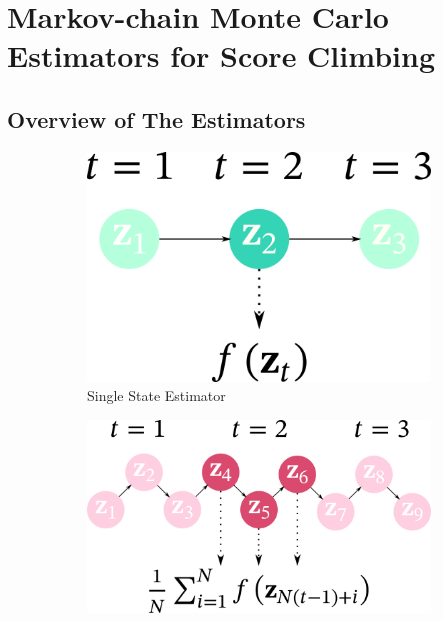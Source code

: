 
\section{Markov-chain Monte Carlo Estimators for Score Climbing}
\vspace{-0.05in}
\subsection{Overview of The Estimators}\label{section:overview}
%


\begin{figure}
  \vspace{-0.5in}
    \centering
    \begin{subfigure}[b]{0.25\textwidth}
        \centering
        \includegraphics[scale=0.25]{figures/diagram_1.png}
        \caption{Single State Estimator}\label{fig:single}
    \end{subfigure}
    \begin{subfigure}[b]{0.35\textwidth}
        \centering
        \includegraphics[scale=0.25]{figures/diagram_2.png}

\end{subfigure}
\end{figure}
